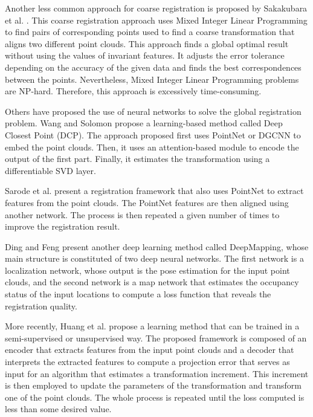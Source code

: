         Another less common approach for coarse registration is proposed by Sakakubara et al. \cite{Sakakubara_2007_automatic}.
        This coarse registration approach uses Mixed Integer Linear Programming to find pairs of corresponding points %
        used to find a coarse transformation that aligns two different point clouds.
        This approach finds a global optimal result without using the values of invariant features.
        It adjusts the error tolerance depending on the accuracy of the given data and 
        finds the best correspondences between the points.
        Nevertheless, Mixed Integer Linear Programming problems are NP-hard. Therefore, this approach is excessively time-consuming.

        Others have proposed the use of neural networks to solve the global registration problem.
        Wang and Solomon \cite{Wang_2019_deepclosest} propose a learning-based method called Deep Closest Point (DCP).
        The approach proposed first uses PointNet \cite{Qi_2017_pointnetdeep} or DGCNN \cite{Wang_2019_dynamic} to embed the point clouds.
        Then, it uses an attention-based module to encode the output of the first part.
        Finally, it estimates the transformation using a differentiable SVD layer.

        Sarode et al. \cite{Sarode_2019_oneframework} present a registration framework that also uses PointNet to extract features from the point clouds.
        The PointNet features are then aligned using another network. The process is then repeated a given number of times to improve the registration result.
        
        Ding and Feng \cite{Ding_2019_deepmapping} present another deep learning method called DeepMapping,
        whose main structure is constituted of two deep neural networks.
        The first network is a localization network, whose output is the pose estimation for the input point clouds,
        and the second network is a map network that estimates the occupancy status of the input locations to compute a loss function that reveals
        the registration quality.

        More recently, Huang et al. \cite{Huang_2020_feature} propose a learning method that can be trained in a semi-supervised or unsupervised way.
        The proposed framework is composed of an encoder that extracts features from the input point clouds
        and a decoder that interprets the extracted features to compute a projection error that serves as input for an algorithm that estimates
        a transformation increment. 
        This increment is then employed to update the parameters of the transformation and transform one of the point clouds.
        The whole process is repeated until the loss computed is less than some desired value.

